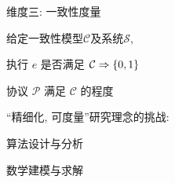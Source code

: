\begin{frame}{维度三: 一致性度量}
  \begin{center}
	给定一致性模型$\mathcal{C}$及系统$\mathcal{S}$,
  \end{center}

  \pause

  \begin{description}
	\centering
	\setlength{\itemsep}{5pt}
	\item[验证 (verify):] 执行 $e$ 是否满足 $\mathcal{C} \Rightarrow \{0,1\}$ 
	\item[量化 (quantify):] 协议 $\mathcal{P}$ 满足 $\mathcal{C}$ 的程度
  \end{description}

  \pause
  \vspace{0.50cm}

  \begin{center}
	``精细化, 可度量''研究理念的挑战:
	\vspace{8pt}
	\begin{description}
	  \centering
	  \item[验证:] 算法设计与分析
	  \item[量化:] 数学建模与求解
	\end{description}
  \end{center}
\end{frame}
